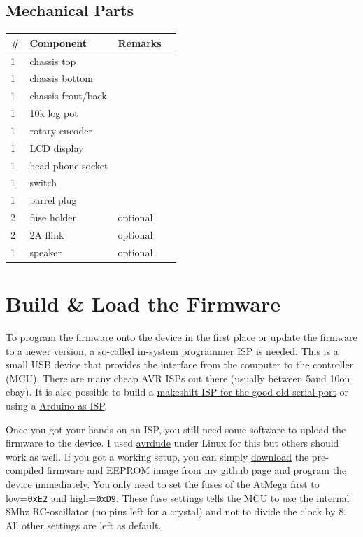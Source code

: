 \documentclass[10pt, a4paper,twoside]{scrartcl}
\begin{document}
\subsection{Mechanical Parts}
\begin{longtable}{|l|p{6cm}|l|l|} \hline 
\# & Component & Remarks \\ \hline 
1 & chassis top & \\
1 & chassis bottom & \\
1 & chassis front/back & \\
1 & 10k log pot & \\
1 & rotary encoder & \\
1 & LCD display & \\
1 & head-phone socket & \\
1 & switch & \\
1 & barrel plug & \\
2 & fuse holder & optional \\
2 & 2A flink & optional \\
1 & speaker & optional \\ \hline
\end{longtable}


\cleardoublepage 
\section{Build \& Load the Firmware} \label{sec:fw}
To program the firmware onto the device in the first place or update the firmware to a newer version, a so-called in-system programmer ISP is needed. This is a small USB device that provides the interface from the computer to the controller (MCU). There are many cheap AVR ISPs out there (usually between 5\EUR and 10\EUR on ebay). It is also possible to build a \href{http://www.lancos.com/siprogsch.html}{makeshift ISP for the good old serial-port} or using a \href{https://www.arduino.cc/en/Tutorial/BuiltInExamples/ArduinoISP}{Arduino as ISP}. 

Once you got your hands on an ISP, you still need some software to upload the firmware to the device. I used \href{https://www.nongnu.org/avrdude/}{avrdude} under Linux for this but others should work as well. If you got a working setup, you can simply \href{https://github.com/hmatuschek/cwtrx/releases}{download} the pre-compiled firmware and EEPROM image from my github page and program the device immediately. You only need to set the fuses of the AtMega first to low=\texttt{0xE2} and high=\texttt{0xD9}. These fuse settings tells the MCU to use the internal 8Mhz RC-oscillator (no pins left for a crystal) and not to divide the clock by 8. All other settings are left as default. 
\end{document}
